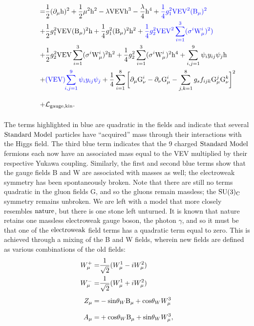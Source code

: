 \begin{align}
\hphantom{\Lag_{\rm SM}'=}=&\frac{1}{2}(\partial_\mu {\rm h})^2 
+ \frac{1}{2}\mu^2 {\rm h}^{2}
- \lambda{\rm VEV}{\rm h}^{3} 
- \frac{\lambda}{4}{\rm h}^{4}
+  {\color{blue} \frac{1}{4}g_{1}^{2}{\rm VEV}^2({\rm B}_{\mu})^2}
\nonumber \\\vp
+ &\frac{1}{2}g_{1}^{2}{\rm VEV}({\rm B}_{\mu})^2{\rm h}
+ \frac{1}{4}g_{1}^{2}({\rm B}_{\mu})^2{\rm h}^2 
+ {\color{blue}\frac{1}{4}g_{2}^2{\rm VEV}^2\sum_{i=1}^{3}(\sigma^{i} {\rm W}^{i}_{\mu})^2)}
\nonumber \\\vp
+ & \frac{1}{2}g_{2}^2 {\rm VEV}\sum_{i=1}^{3}(\sigma^{i} {\rm W}^{i}_{\mu})^2{\rm h}^2
+ \frac{1}{4}g_{2}^2\sum_{i=1}^{3}(\sigma^{i} {\rm W}^{i}_{\mu})^2{\rm h}^4
+ \sum_{i,j=1}^{9}\psi_i y_{ij} \psi_{j}{\rm h}
\nonumber \\\vp 
+ & {\color{blue}({\rm VEV})\hspace{-.1cm}\sum_{i,j=1}^{9}\psi_i y_{ij} \psi_{j}}
+ \frac{1}{4}\sum_{i=1}^{8}\bigg[\partial_\mu {\rm G}^{i}_\nu - \partial_\nu {\rm G}^{i}_\mu - \sum_{j,k=1}^{8}g_s f_{ijk} {\rm G}^{j}_{\mu}{\rm G}^{k}_{\nu}\bigg]^2 
\nonumber \\\vp 
+ &\Lag_{\rm gauge, kin}.
\end{align}
The terms highlighted in blue are quadratic in the fields and indicate that several $\text{Standard\ Model}$ particles have ``acquired'' mass through their interactions with the Higgs field. The third blue term indicates that the 9 charged $\text{Standard\ Model}$ fermions each now have an associated mass equal to the VEV multiplied by their respective Yukawa coupling. Similarly, the first and second blue terms show that the gauge fields B and W are associated with masses as well; the electroweak symmetry has been spontaneously broken. Note that there are still no terms quadratic in the gluon fields G, and so the gluons remain massless; the $\rm SU(3)_{C}$ symmetry remains unbroken. We are left with a model that more closely resembles $\rm nature$, but there is one stone left unturned. It is known that nature retains one massless electroweak gauge boson, the photon $\gamma$, and so it must be that one of the $\rm electroweak$ field terms has a quadratic term equal to zero. This is achieved through a mixing of the B and W fields, wherein new fields are defined as various combinations of the old fields:
\begin{align}
\vps W_{\mu}^{+} =& \frac{1}{\sqrt{2}}(W_{\mu}^1 - i W_{\mu}^2)\\
\vps W_{\mu}^{-} =& \frac{1}{\sqrt{2}}(W_{\mu}^1 + i W_{\mu}^2)\\
\vps Z_{\mu} =& -{\rm sin}\theta_{W}{\rm B}_\mu+{\rm cos}\theta_{W}W_{\mu}^3\\
\vps A_{\mu} =&+{\rm cos}\theta_{W}{\rm B}_\mu+{\rm sin}\theta_{W}W_{\mu}^3,
\end{align}
